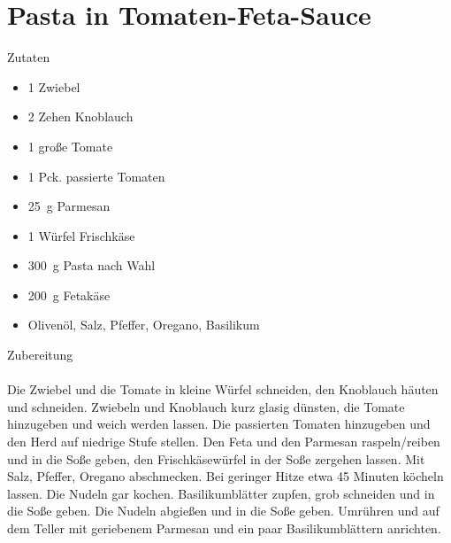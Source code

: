 \section*{Pasta in Tomaten-Feta-Sauce}
\ihead{}\ohead{}
{\Large Zutaten}
\begin{multicols}{2}
\begin{itemize}
    \item \num{1} Zwiebel
    \item \num{2} Zehen Knoblauch
    \item \num{1} große Tomate
    \item \num{1} Pck. passierte Tomaten
    \item \SI{25}{g} Parmesan
    \item \num{1} Würfel Frischkäse
    \item \SI{300}{g} Pasta nach Wahl
    \item \SI{200}{g} Fetakäse
    \item Olivenöl, Salz, Pfeffer, Oregano, Basilikum
\end{itemize}
\end{multicols}
\noindent
{\Large Zubereitung}\\
\\
Die Zwiebel und die Tomate in kleine Würfel schneiden, den Knoblauch häuten und schneiden.
Zwiebeln und Knoblauch kurz glasig dünsten, die Tomate hinzugeben und weich werden lassen.
Die passierten Tomaten hinzugeben und den Herd auf niedrige Stufe stellen.
Den Feta und den Parmesan raspeln/reiben und in die Soße geben, den Frischkäsewürfel in der Soße zergehen lassen.
Mit Salz, Pfeffer, Oregano abschmecken.
Bei geringer Hitze etwa 45 Minuten köcheln lassen. 
Die Nudeln gar kochen. Basilikumblätter zupfen, grob schneiden und in die Soße geben.
Die Nudeln abgießen und in die Soße geben. 
Umrühren und auf dem Teller mit geriebenem Parmesan und ein paar Basilikumblättern anrichten.
